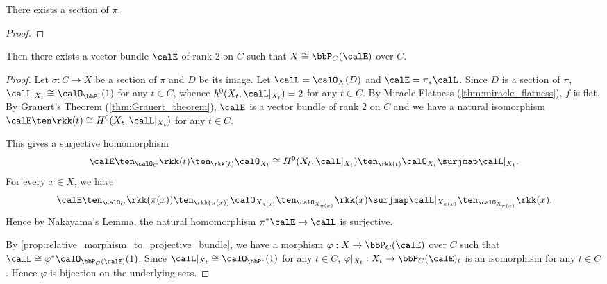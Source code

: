    \begin{lemma}\label{lem:existence_of_section_of_ruled_surface}
        There exists a section of \(\pi\).
    \end{lemma}
    \begin{proof}
    \end{proof}

    \begin{proposition}\label{prop:ruled_surface_as_projective_bundle}
        Then there exists a vector bundle \(\calE\) of rank \(2\) on \(C\) such that \(X \cong \bbP_C(\calE)\) over \(C\).
    \end{proposition}
    \begin{proof}
        Let \(\sigma:C \to X\) be a section of \(\pi\) and \(D\) be its image.
        Let \(\calL = \calO_X(D)\) and \(\calE = \pi_*\calL\).
        Since \(D\) is a section of \(\pi\), \(\calL|_{X_t} \cong \calO_{\bbP^1}(1)\) for any \(t \in C\), whence \(h^0(X_t,\calL|_{X_t}) = 2\) for any \(t \in C\).
        By Miracle Flatness (\cref{thm:miracle_flatness}), \(f\) is flat.
        By Grauert's Theorem (\cref{thm:Grauert_theorem}), \(\calE\) is a vector bundle of rank \(2\) on \(C\) and we have a natural isomorphism \(\calE \ten \rkk(t) \cong H^0(X_t,\calL|_{X_t})\) for any \(t \in C\).

        This gives a surjective homomorphism 
        \[ \calE \ten_{\calO_C} \rkk(t) \ten_{\rkk(t)} \calO_{X_t} \cong H^0(X_t,\calL|_{X_t}) \ten_{\rkk(t)} \calO_{X_t} \surjmap \calL|_{X_t}. \]
        For every \(x \in X\), we have 
        \[ \calE \ten_{\calO_C} \rkk(\pi(x)) \ten_{\rkk(\pi(x))} \calO_{X_{\pi(x)}} \ten_{\calO_{X_{\pi(x)}}} \rkk(x)  \surjmap \calL|_{X_{\pi(x)}}\ten_{\calO_{X_{\pi(x)}}} \rkk(x). \]
        Hence by Nakayama's Lemma, the natural homomorphism \(\pi^*\calE \to \calL\) is surjective.

        By \cref{prop:relative_morphism_to_projective_bundle}, we have a morphism \(\varphi:X \to \bbP_C(\calE)\) over \(C\) such that \(\calL \cong \varphi^*\calO_{\bbP_C(\calE)}(1)\).
        Since \(\calL|_{X_t} \cong \calO_{\bbP^1}(1)\) for any \(t \in C\), \(\varphi|_{X_t}:X_t \to \bbP_C(\calE)_t\) is an isomorphism for any \(t \in C\).
        Hence \(\varphi\) is bijection on the underlying sets.
    \end{proof}


